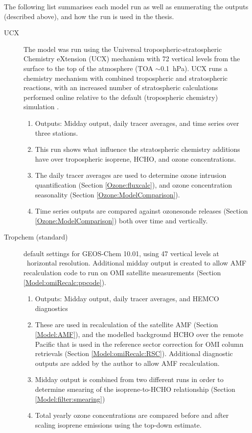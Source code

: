       The following list summarises each model run as well as enumerating the outputs (described above), and how the run is used in the thesis.
      \begin{description}
        \item[UCX]%
          The model was run using the Universal tropospheric-stratospheric Chemistry eXtension (UCX) mechanism with 72 vertical levels from the surface to the top of the atmosphere (TOA $\sim$0.1~hPa).
          UCX runs a chemistry mechanism with combined tropospheric and stratospheric reactions, with an increased number of stratospheric calculations performed online relative to the default (tropospheric chemistry) simulation \parencite{Eastham2014}.
          \begin{enumerate}
            \item Outputs: Midday output, daily tracer averages, and time series over three stations.
            \item This run shows what influence the stratospheric chemistry additions have over tropospheric isoprene, HCHO, and ozone concentrations.
            \item The daily tracer averages are used to determine ozone intrusion quantification (Section \ref{Ozone:fluxcalc}), and ozone concentration seasonality (Section \ref{Ozone:ModelComparison}).
            \item Time series outputs are compared against ozonesonde releases (Section \ref{Ozone:ModelComparison}) both over time and vertically.
          \end{enumerate}
        
        \item [Tropchem (standard)]%
          default settings for GEOS-Chem 10.01, using 47 vertical levels at \lowhr ~horizontal resolution.
          Additional midday output is created to allow AMF recalculation code to run on OMI satellite measurements (Section \ref{Model:omiRecalc:ppcode}).
          \begin{enumerate}
            \item Outputs: Midday output, daily tracer averages, and HEMCO diagnostics
            \item These are used in recalculation of the satellite AMF (Section \ref{Model:AMF}), and the modelled background HCHO over the remote Pacific that is used in the reference sector correction for OMI column retrievals (Section \ref{Model:omiRecalc:RSC}).
            Additional diagnostic outputs are added by the author to allow AMF recalculation.
            \item Midday output is combined from two different runs in order to determine smearing of the isoprene-to-HCHO relationship (Section \ref{Model:filter:smearing})
            \item Total yearly ozone concentrations are compared before and after scaling isoprene emissions using the top-down estimate.
          \end{enumerate}
        

\end{description}
